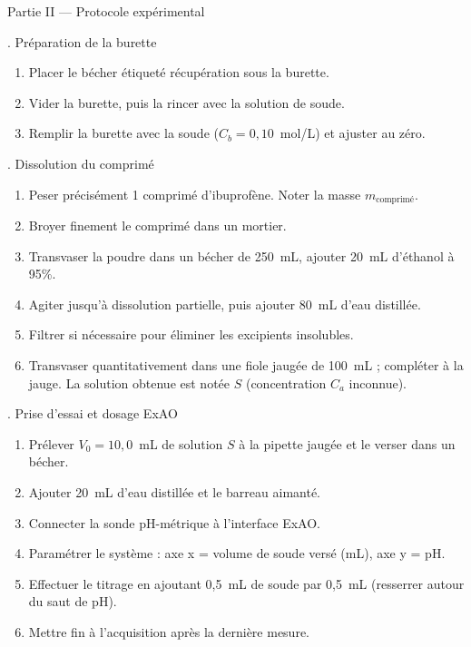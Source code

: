 \documentclass[11pt,a4paper]{article}
\newcommand{\sectitle}[1]{%
  \vspace{6pt}
  \noindent\colorbox{exoheader}{\parbox{\dimexpr\linewidth-2\fboxsep}%
    {\color{white}\bfseries\large\strut\quad #1}}
  \vspace{4pt}
}
\newcommand{\subsectitle}[1]{%
  \vspace{4pt}
  \noindent\colorbox{exolight}{\parbox{\dimexpr\linewidth-2\fboxsep}%
    {\color{exoheader}\bfseries\strut\quad #1}}
  \vspace{2pt}
}
\begin{document}
\vspace{0.3cm}\noindent\dotfill

\sectitle{Partie II --- Protocole expérimental}

\subsectitle{1. Préparation de la burette}

\begin{enumerate}[leftmargin=1.5cm, label=\textcolor{exoheader}{\textbf{\arabic*.}}]
  \item Placer le bécher étiqueté \og récupération \fg{} sous la burette.
  \item Vider la burette, puis la rincer avec la solution de soude.
  \item Remplir la burette avec la soude ($C_b = 0{,}10$~mol/L) et ajuster au zéro.
\end{enumerate}

\vspace{4pt}
\subsectitle{2. Dissolution du comprimé}

\begin{enumerate}[leftmargin=1.5cm, label=\textcolor{exoheader}{\textbf{\arabic*.}}]
  \item Peser précisément 1 comprimé d'ibuprofène. Noter la masse $m_{\text{comprimé}}$.
  \item Broyer finement le comprimé dans un mortier.
  \item Transvaser la poudre dans un bécher de 250~mL, ajouter 20~mL d'éthanol à 95\%.
  \item Agiter jusqu'à dissolution partielle, puis ajouter 80~mL d'eau distillée.
  \item Filtrer si nécessaire pour éliminer les excipients insolubles.
  \item Transvaser quantitativement dans une fiole jaugée de 100~mL ; compléter à la jauge.
        La solution obtenue est notée $S$ (concentration $C_a$ inconnue).
\end{enumerate}

\vspace{4pt}
\subsectitle{3. Prise d'essai et dosage ExAO}

\begin{enumerate}[leftmargin=1.5cm, label=\textcolor{exoheader}{\textbf{\arabic*.}}]
  \item Prélever $V_0 = 10{,}0$~mL de solution $S$ à la pipette jaugée et le verser dans un bécher.
  \item Ajouter 20~mL d'eau distillée et le barreau aimanté.
  \item Connecter la sonde pH-métrique à l'interface ExAO.
  \item Paramétrer le système : axe x = volume de soude versé (mL), axe y = pH.
  \item Effectuer le titrage en ajoutant 0,5~mL de soude par 0,5~mL (resserrer autour du saut de pH).
  \item Mettre fin à l'acquisition après la dernière mesure.
\end{enumerate}
\end{document}
